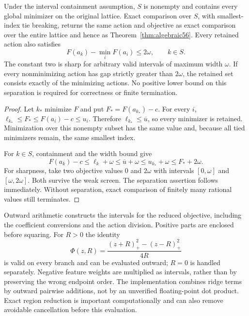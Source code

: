 \begin{theorem}\label{thm:screen58}
Under the interval containment assumption, $S$ is nonempty and contains every global minimizer on the original lattice. Exact comparison over $S$, with smallest-index tie breaking, returns the same action and objective as exact comparison over the entire lattice and hence as Theorem~\ref{thm:algebraic56}. Every retained action also satisfies
\begin{equation}\label{eq:retained-gap58}
 F(a_k)-\min_i F(a_i)\le2\omega,\qquad k\in S.
\end{equation}
The constant two is sharp for arbitrary valid intervals of maximum width $\omega$. If every nonminimizing action has gap strictly greater than $2\omega$, the retained set consists exactly of the minimizing actions. No positive lower bound on this separation is required for correctness or finite termination.
\end{theorem}
\begin{proof}
Let $k_*$ minimize $F$ and put $F_*=F(a_{k_*})-c$. For every $i$,
$\ell_{k_*}\le F_*\le F(a_i)-c\le u_i$. Therefore $\ell_{k_*}\le\overline u$, so every minimizer is retained. Minimization over this nonempty subset has the same value and, because all tied minimizers remain, the same smallest index.

For $k\in S$, containment and the width bound give
\[
 F(a_k)-c\le\ell_k+\omega
       \le\overline u+\omega
       \le u_{k_*}+\omega\le F_*+2\omega.
\]
For sharpness, take two objective values $0$ and $2\omega$ with intervals $[0,\omega]$ and $[\omega,2\omega]$. Both survive the weak screen. The separation assertion follows immediately. Without separation, exact comparison of finitely many rational values still terminates.
\end{proof}

Outward arithmetic constructs the intervals for the reduced objective, including the coefficient conversions and the action division. Positive parts are enclosed before squaring. For $R>0$ the identity
\[
 \Phi(z,R)=\frac{(z+R)_+^2-(z-R)_+^2}{4R}
\]
is valid on every branch and can be evaluated outward; $R=0$ is handled separately. Negative feature weights are multiplied as intervals, rather than by preserving the wrong endpoint order. The implementation combines ridge terms by outward pairwise additions, not by an unverified floating-point dot product. Exact region reduction is important computationally and can also remove avoidable cancellation before this evaluation.

